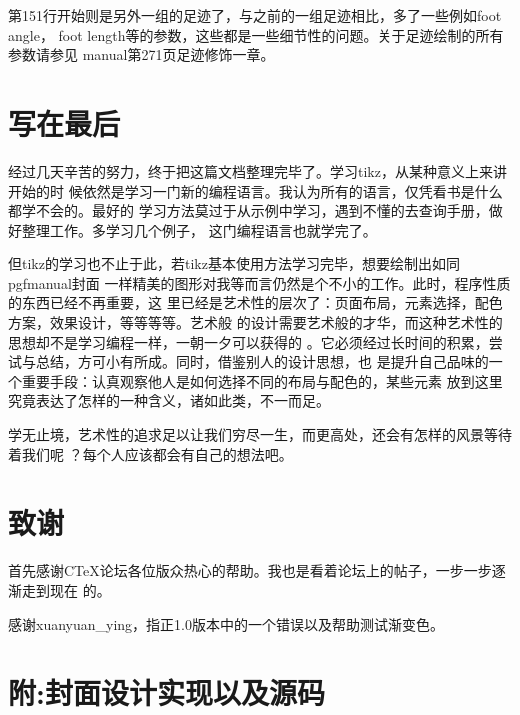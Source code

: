 \documentclass[10pt,a4paper,titlepage]{article}
\begin{document}
第151行开始则是另外一组的足迹了，与之前的一组足迹相比，多了一些例如foot angle，
foot length等的参数，这些都是一些细节性的问题。关于足迹绘制的所有参数请参见
manual第271页足迹修饰一章。

\section{写在最后}

经过几天辛苦的努力，终于把这篇文档整理完毕了。学习tikz，从某种意义上来讲开始的时
候依然是学习一门新的编程语言。我认为所有的语言，仅凭看书是什么都学不会的。最好的
学习方法莫过于从示例中学习，遇到不懂的去查询手册，做好整理工作。多学习几个例子，
这门编程语言也就学完了。

但tikz的学习也不止于此，若tikz基本使用方法学习完毕，想要绘制出如同pgfmanual封面
一样精美的图形对我等而言仍然是个不小的工作。此时，程序性质的东西已经不再重要，这
里已经是艺术性的层次了：页面布局，元素选择，配色方案，效果设计，等等等等。艺术般
的设计需要艺术般的才华，而这种艺术性的思想却不是学习编程一样，一朝一夕可以获得的
。它必须经过长时间的积累，尝试与总结，方可小有所成。同时，借鉴别人的设计思想，也
是提升自己品味的一个重要手段：认真观察他人是如何选择不同的布局与配色的，某些元素
放到这里究竟表达了怎样的一种含义，诸如此类，不一而足。

学无止境，艺术性的追求足以让我们穷尽一生，而更高处，还会有怎样的风景等待着我们呢
？每个人应该都会有自己的想法吧。

\section{致谢}

首先感谢CTeX论坛各位版众热心的帮助。我也是看着论坛上的帖子，一步一步逐渐走到现在
的。

感谢xuanyuan\_ying，指正1.0版本中的一个错误以及帮助测试渐变色。

\clearpage
{}
{}
\section*{附:封面设计实现以及源码}


\clearpage

\end{document}
